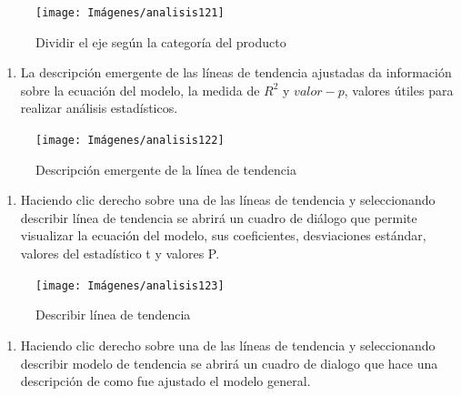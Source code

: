 \documentclass[
]{book}
\providecommand{\tightlist}{%
  \setlength{\itemsep}{0pt}\setlength{\parskip}{0pt}}
\begin{document}
\begin{figure}

{\centering \texttt{[image: Imágenes/analisis121]} 

}

\caption{Dividir el eje según la categoría del producto}\label{fig:paso6dispersion-fig}
\end{figure}

\begin{enumerate}
\def\labelenumi{\arabic{enumi}.}
\setcounter{enumi}{6}
\tightlist
\item
  La descripción emergente de las líneas de tendencia ajustadas da información sobre la ecuación del modelo, la medida de \(R^2\) y \(valor-p\), valores útiles para realizar análisis estadísticos.
\end{enumerate}

\begin{figure}

{\centering \texttt{[image: Imágenes/analisis122]} 

}

\caption{Descripción emergente de la línea de tendencia}\label{fig:paso7dispersion-fig}
\end{figure}

\begin{enumerate}
\def\labelenumi{\arabic{enumi}.}
\setcounter{enumi}{7}
\tightlist
\item
  Haciendo clic derecho sobre una de las líneas de tendencia y seleccionando describir línea de tendencia se abrirá un cuadro de diálogo que permite visualizar la ecuación del modelo, sus coeficientes, desviaciones estándar, valores del estadístico t y valores P.
\end{enumerate}

\begin{figure}

{\centering \texttt{[image: Imágenes/analisis123]} 

}

\caption{Describir línea de tendencia}\label{fig:paso8dispersion-fig}
\end{figure}

\begin{enumerate}
\def\labelenumi{\arabic{enumi}.}
\setcounter{enumi}{8}
\tightlist
\item
  Haciendo clic derecho sobre una de las líneas de tendencia y seleccionando describir modelo de tendencia se abrirá un cuadro de dialogo que hace una descripción de como fue ajustado el modelo general.
\end{enumerate}
\end{document}
